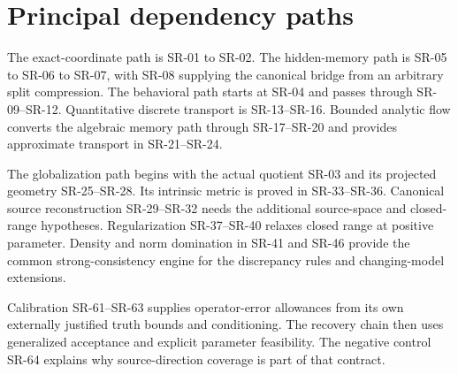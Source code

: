\documentclass[11pt]{article}
\theoremstyle{definition}\newtheorem{definition}[theorem]{Definition}
\theoremstyle{remark}\newtheorem{remark}[theorem]{Remark}
\begin{document}
\section{Principal dependency paths}
The exact-coordinate path is SR-01 to SR-02. The hidden-memory path is
SR-05 to SR-06 to SR-07, with SR-08 supplying the canonical bridge from an
arbitrary split compression. The behavioral path starts at SR-04 and
passes through SR-09--SR-12. Quantitative discrete transport is
SR-13--SR-16. Bounded analytic flow converts the algebraic memory path
through SR-17--SR-20 and provides approximate transport in SR-21--SR-24.

The globalization path begins with the actual quotient SR-03 and its
projected geometry SR-25--SR-28. Its intrinsic metric is proved in
SR-33--SR-36. Canonical source reconstruction SR-29--SR-32 needs the
additional source-space and closed-range hypotheses. Regularization
SR-37--SR-40 relaxes closed range at positive parameter. Density and
norm domination in SR-41 and SR-46 provide the common strong-consistency
engine for the discrepancy rules and changing-model extensions.

Calibration SR-61--SR-63 supplies operator-error allowances from its own
externally justified truth bounds and conditioning. The recovery chain
then uses generalized acceptance and explicit parameter feasibility.
The negative control SR-64 explains why source-direction coverage is
part of that contract.
\end{document}

